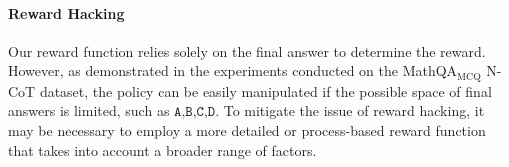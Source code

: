 \paragraph{Reward Hacking}
Our reward function relies solely on the final answer to determine the reward. However, as demonstrated in the experiments conducted on the MathQA$_\text{MCQ}$ N-CoT dataset, the policy can be easily manipulated if the possible space of final answers is limited, such as ${\texttt{A,B,C,D}}$. To mitigate the issue of reward hacking, it may be necessary to employ a more detailed or process-based reward function that takes into account a broader range of factors.

